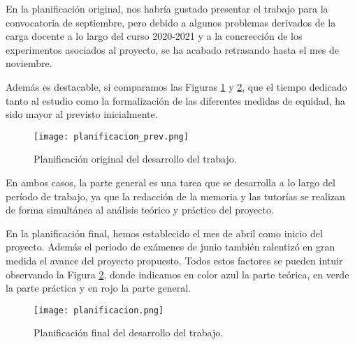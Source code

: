 En la planificación original, nos habría gustado presentar el trabajo para la convocatoria de septiembre, pero debido a algunos problemas derivados de la carga docente a lo largo del curso 2020-2021 y a la concrección de los experimentos asociados al proyecto, se ha acabado retrasando hasta el mes de noviembre.

Además es destacable, si comparamos las Figuras \ref{fig:planning_prev} y \ref{fig:planning}, que el tiempo dedicado tanto al estudio como la formalización de las diferentes medidas de equidad, ha sido mayor al previsto inicialmente.\\

\begin{figure}[h]
	\centering
	\texttt{[image: planificacion\_prev.png]}
	\caption{Planificación original del desarrollo del trabajo.}
    \label{fig:planning_prev}
\end{figure}

\clearpage

En ambos casos, la parte general es una tarea que se desarrolla a lo largo del período de trabajo, ya que la redacción de la memoria y las tutorías se realizan de forma simultánea al análisis teórico y práctico del proyecto. 

En la planificación final, hemos establecido el mes de abril como inicio del proyecto. Además el periodo de exámenes de junio también ralentizó en gran medida el avance del proyecto propuesto. Todos estos factores se pueden intuir observando la Figura \ref{fig:planning}, donde indicamos en color azul la parte teórica, en verde la parte práctica y en rojo la parte general.\\

\begin{figure}[h]
	\centering
	\texttt{[image: planificacion.png]}
	\caption{Planificación final del desarrollo del trabajo.}
    \label{fig:planning}
\end{figure}

